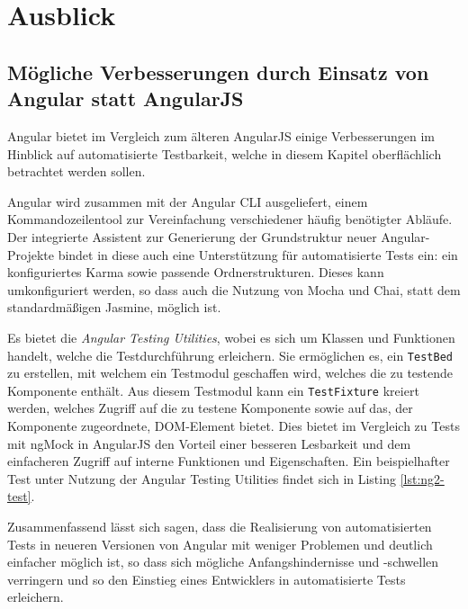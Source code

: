 \section{Ausblick}
\subsection{Mögliche Verbesserungen durch Einsatz von Angular statt AngularJS}
Angular bietet im Vergleich zum älteren AngularJS einige Verbesserungen im Hinblick auf automatisierte Testbarkeit, welche in diesem Kapitel oberflächlich betrachtet werden sollen.

Angular wird zusammen mit der Angular CLI ausgeliefert, einem Kommandozeilentool zur Vereinfachung verschiedener häufig benötigter Abläufe. Der integrierte Assistent zur Generierung der Grundstruktur neuer Angular-Projekte bindet in diese auch eine Unterstützung für automatisierte Tests ein: ein konfiguriertes Karma sowie passende Ordnerstrukturen. Dieses kann umkonfiguriert werden, so dass auch die Nutzung von Mocha und Chai, statt dem standardmäßigen Jasmine, möglich ist.\cite{ng2-cli}

Es bietet die \textit{Angular Testing Utilities}, wobei es sich um Klassen und Funktionen handelt, welche die Testdurchführung erleichern. Sie ermöglichen es, ein \texttt{TestBed} zu erstellen, mit welchem ein Testmodul geschaffen wird, welches die zu testende Komponente enthält. Aus diesem Testmodul kann ein \texttt{TestFixture} kreiert werden, welches Zugriff auf die zu testene Komponente sowie auf das, der Komponente zugeordnete, DOM-Element bietet. Dies bietet im Vergleich zu Tests mit ngMock in AngularJS den Vorteil einer besseren Lesbarkeit und dem einfacheren Zugriff auf interne Funktionen und Eigenschaften. Ein beispielhafter Test unter Nutzung der Angular Testing Utilities findet sich in Listing \ref{lst:ng2-test}. \cite{ng2-test}

Zusammenfassend lässt sich sagen, dass die Realisierung von automatisierten Tests in neueren Versionen von Angular mit weniger Problemen und deutlich einfacher möglich ist, so dass sich mögliche Anfangshindernisse und -schwellen verringern und so den Einstieg eines Entwicklers in automatisierte Tests erleichern. 

\begin{figure}[H]
	
\end{figure}

